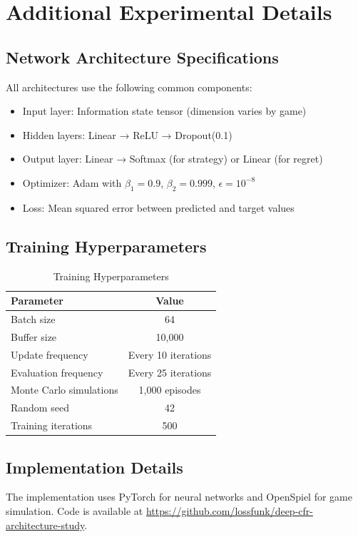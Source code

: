 \documentclass{article}
\begin{document}
\appendix
\section{Additional Experimental Details}

\subsection{Network Architecture Specifications}

All architectures use the following common components:
\begin{itemize}
\item Input layer: Information state tensor (dimension varies by game)
\item Hidden layers: Linear → ReLU → Dropout(0.1)
\item Output layer: Linear → Softmax (for strategy) or Linear (for regret)
\item Optimizer: Adam with $\beta_1=0.9$, $\beta_2=0.999$, $\epsilon=10^{-8}$
\item Loss: Mean squared error between predicted and target values
\end{itemize}

\subsection{Training Hyperparameters}

\begin{table}[h]
\centering
\caption{Training Hyperparameters}
\begin{tabular}{lc}
\toprule
Parameter & Value \\
\midrule
Batch size & 64 \\
Buffer size & 10,000 \\
Update frequency & Every 10 iterations \\
Evaluation frequency & Every 25 iterations \\
Monte Carlo simulations & 1,000 episodes \\
Random seed & 42 \\
Training iterations & 500 \\
\bottomrule
\end{tabular}
\end{table}

\subsection{Implementation Details}

The implementation uses PyTorch for neural networks and OpenSpiel for game simulation. Code is available at \url{https://github.com/lossfunk/deep-cfr-architecture-study}.
\end{document}
